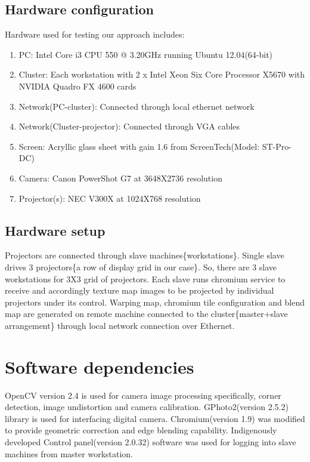 \documentclass{article}
\begin{document}
\subsection{Hardware configuration}
Hardware used for testing our approach includes:
\begin{enumerate}
\item PC: Intel Core i3 CPU 550 @ 3.20GHz running Ubuntu 12.04(64-bit)
\item Cluster: Each workstation with 2 x Intel Xeon Six Core Processor X5670 with NVIDIA Quadro FX 4600 cards 
\item Network(PC-cluster): Connected through local ethernet network
\item Network(Cluster-projector): Connected through VGA cables
\item Screen: Acryllic glass sheet with gain 1.6 from ScreenTech(Model: ST-Pro-DC)		
\item Camera: Canon PowerShot G7 at 3648X2736 resolution
\item Projector(s): NEC V300X at 1024X768 resolution
\end{enumerate}

\subsection{Hardware setup}
Projectors are connected through slave machines\{workstations\}. Single slave drives 3 projectors\{a row of display grid in our case\}. So, there are 3 slave workstations for 3X3 grid of projectors. Each slave runs chromium service to receive and accordingly texture map images to be projected by individual projectors under its control. Warping map, chromium tile configuration and blend map are generated on remote machine connected to the cluster\{master+slave arrangement\} through local network connection over Ethernet.



\section{Software dependencies}
OpenCV version 2.4 is used for camera image processing specifically, corner detection, image undistortion and camera calibration. GPhoto2(version 2.5.2) library is used for interfacing digital camera. Chromium(version 1.9)\cite{4} was modified to provide geometric correction and edge blending capability. Indigenously developed Control panel(version 2.0.32) software was used for logging into slave machines from master workstation.
\end{document}

